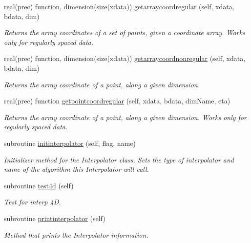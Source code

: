 \begin{DoxyCompactItemize}
real(prec) function, dimension(size(xdata)) \mbox{\hyperlink{namespaceinterpolator__mod_af568a0d2fbcd2dc571f47372a8f4cce8}{getarraycoordregular}} (self, xdata, bdata, dim)
\begin{DoxyCompactList}\small\item\em Returns the array coordinates of a set of points, given a coordinate array. Works only for regularly spaced data. \end{DoxyCompactList}\item 
real(prec) function, dimension(size(xdata)) \mbox{\hyperlink{namespaceinterpolator__mod_a8c61cbe21c0cf09029e9117b7b1520df}{getarraycoordnonregular}} (self, xdata, bdata, dim)
\begin{DoxyCompactList}\small\item\em Returns the array coordinate of a point, along a given dimension. \end{DoxyCompactList}\item 
real(prec) function \mbox{\hyperlink{namespaceinterpolator__mod_ab47cccb1adf61dcfca1b1ca5a5d213cd}{getpointcoordregular}} (self, xdata, bdata, dim\+Name, eta)
\begin{DoxyCompactList}\small\item\em Returns the array coordinate of a point, along a given dimension. Works only for regularly spaced data. \end{DoxyCompactList}\item 
subroutine \mbox{\hyperlink{namespaceinterpolator__mod_adcaf3bba800f19991ed4f33c968184e9}{initinterpolator}} (self, flag, name)
\begin{DoxyCompactList}\small\item\em Initializer method for the Interpolator class. Sets the type of interpolator and name of the algorithm this Interpolator will call. \end{DoxyCompactList}\item 
subroutine \mbox{\hyperlink{namespaceinterpolator__mod_ac27ad06522b34071302dc09d10b0ec7e}{test4d}} (self)
\begin{DoxyCompactList}\small\item\em Test for interp 4D. \end{DoxyCompactList}\item 
subroutine \mbox{\hyperlink{namespaceinterpolator__mod_a9b149bc8a3da5d1864b8c049f8b00697}{printinterpolator}} (self)
\begin{DoxyCompactList}\small\item\em Method that prints the Interpolator information. \end{DoxyCompactList}\end{DoxyCompactItemize}


